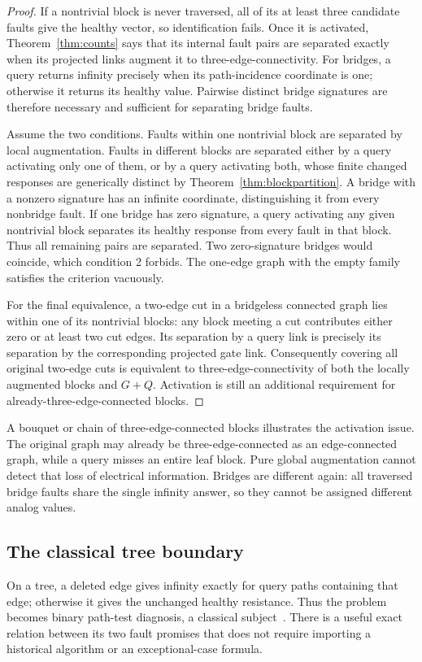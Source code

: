 \documentclass[11pt,letterpaper]{article}
\begin{document}
\begin{proof}
If a nontrivial block is never traversed, all of its at least three candidate faults give the healthy vector, so identification fails. Once it is activated, Theorem~\ref{thm:counts} says that its internal fault pairs are separated exactly when its projected links augment it to three-edge-connectivity. For bridges, a query returns infinity precisely when its path-incidence coordinate is one; otherwise it returns its healthy value. Pairwise distinct bridge signatures are therefore necessary and sufficient for separating bridge faults.

Assume the two conditions. Faults within one nontrivial block are separated by local augmentation. Faults in different blocks are separated either by a query activating only one of them, or by a query activating both, whose finite changed responses are generically distinct by Theorem~\ref{thm:blockpartition}. A bridge with a nonzero signature has an infinite coordinate, distinguishing it from every nonbridge fault. If one bridge has zero signature, a query activating any given nontrivial block separates its healthy response from every fault in that block. Thus all remaining pairs are separated. Two zero-signature bridges would coincide, which condition 2 forbids. The one-edge graph with the empty family satisfies the criterion vacuously.

For the final equivalence, a two-edge cut in a bridgeless connected graph lies within one of its nontrivial blocks: any block meeting a cut contributes either zero or at least two cut edges. Its separation by a query link is precisely its separation by the corresponding projected gate link. Consequently covering all original two-edge cuts is equivalent to three-edge-connectivity of both the locally augmented blocks and $G+Q$. Activation is still an additional requirement for already-three-edge-connected blocks.
\end{proof}

A bouquet or chain of three-edge-connected blocks illustrates the activation issue. The original graph may already be three-edge-connected as an edge-connected graph, while a query misses an entire leaf block. Pure global augmentation cannot detect that loss of electrical information. Bridges are different again: all traversed bridge faults share the single infinity answer, so they cannot be assigned different analog values.

\subsection{The classical tree boundary}
On a tree, a deleted edge gives infinity exactly for query paths containing that edge; otherwise it gives the unchanged healthy resistance. Thus the problem becomes binary path-test diagnosis, a classical subject~\cite{IKT}. There is a useful exact relation between its two fault promises that does not require importing a historical algorithm or an exceptional-case formula.
\end{document}

